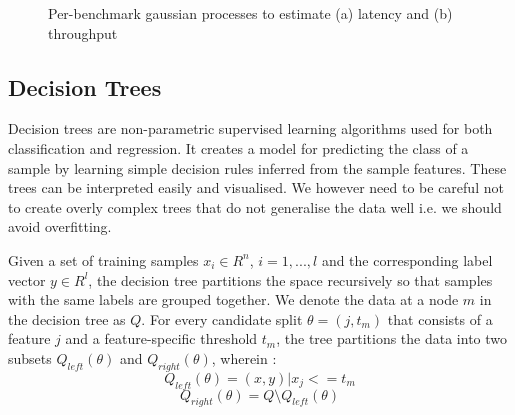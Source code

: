 \begin{figure}
\centering
{}
%

\caption{Per-benchmark gaussian processes to estimate (a) latency and
  (b) throughput}
\label{fig:gp_r2}
\end{figure}


\subsection{Decision Trees}
\label{sec:dt}

Decision trees are non-parametric supervised learning algorithms used for
both classification and regression. 
It creates a model for predicting the class of a sample by learning
simple decision rules inferred from the sample features\citep{stats01}.
These trees can be interpreted easily and visualised.
We however need to be careful not to create overly complex trees 
that do not generalise the data well i.e. we should avoid overfitting. 

Given a set of training samples $x_i \in R^n$, $i=1,...,l$ and the
corresponding label vector $y \in R^l$, the decision tree partitions 
the space recursively so that samples with the same labels are grouped
together.
We denote the data at a node $m$ in the decision tree as $Q$. For
every candidate split $\theta = (j, t_m)$ that consists of a feature $j$ 
and a feature-specific threshold $t_m$, the tree partitions the data into
two subsets $Q_{left}(\theta)$ and $Q_{right}(\theta)$, wherein :
$$Q_{left}(\theta) = {(x, y) | x_j <= t_m}$$ 
$$Q_{right}(\theta) = Q \setminus Q_{left}(\theta)$$

